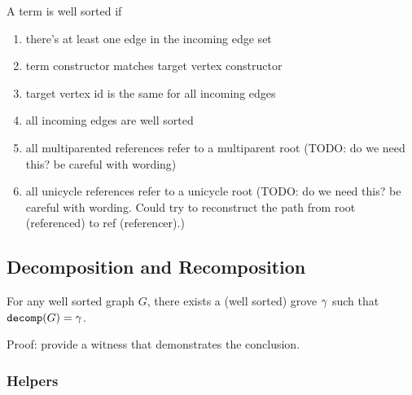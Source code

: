 \begin{definition}
  A term is well sorted if
  \begin{enumerate}
    \item there's at least one edge in the incoming edge set
    \item term constructor matches target vertex constructor
    \item target vertex id is the same for all incoming edges
    \item all incoming edges are well sorted
    \item all multiparented references refer to a multiparent root (TODO: do we need this? be careful with wording)
    \item all unicycle references refer to a unicycle root (TODO: do we need this? be careful with wording. Could try to reconstruct the path from root (referenced) to ref (referencer).)
    \end{enumerate}
\end{definition}


\subsection{Decomposition and Recomposition}

\begin{theorem}
  For any well sorted graph $G$,
  there exists a (well sorted) grove $\gamma$
  such that $\operatorname{\texttt{decomp}}\mathopen{}\left(G\right)\mathclose{} = \gamma$.
\end{theorem}

Proof: provide a witness that demonstrates the conclusion.




\subsubsection{Helpers}

